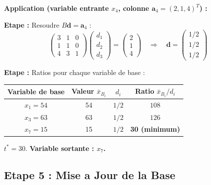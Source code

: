\documentclass[12pt,a4paper]{article}
\newcommand*\circled[1]{\tikz[baseline=(char.base)]{\node[shape=circle,draw,inner sep=2pt] (char) {#1};}}
\begin{document}
\begin{exemple}
\textbf{Application (variable entrante $x_4$, colonne $\mathbf{a}_4 = (2, 1, 4)^T$) :}

\textbf{Etape \circled{3} :} Resoudre $B\mathbf{d} = \mathbf{a}_4$ :
$$\begin{pmatrix} 3 & 1 & 0 \\ 1 & 1 & 0 \\ 4 & 3 & 1 \end{pmatrix} \begin{pmatrix} d_1 \\ d_2 \\ d_3 \end{pmatrix} = \begin{pmatrix} 2 \\ 1 \\ 4 \end{pmatrix} \quad \Rightarrow \quad \mathbf{d} = \begin{pmatrix} 1/2 \\ 1/2 \\ 1/2 \end{pmatrix}$$

\textbf{Etape \circled{4} :} Ratios pour chaque variable de base :

\begin{center}
\begin{tabular}{c|c|c|c}
\toprule
Variable de base & Valeur $\bar{x}_{B_i}$ & $d_i$ & Ratio $\bar{x}_{B_i}/d_i$ \\
\midrule
$x_1 = 54$ & 54 & $1/2$ & $108$ \\
$x_3 = 63$ & 63 & $1/2$ & $126$ \\
$x_7 = 15$ & 15 & $1/2$ & \textcolor{importantrouge}{\textbf{30 (minimum)}} \\
\bottomrule
\end{tabular}
\end{center}

$t^* = 30$. \textcolor{importantrouge}{\textbf{Variable sortante : $x_7$.}}
\end{exemple}

\newpage
\subsection{Etape 5 : Mise a Jour de la Base}
\end{document}
